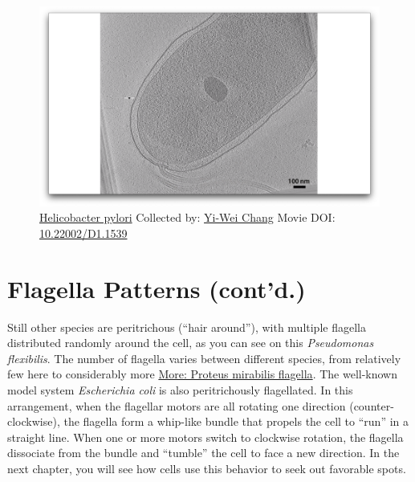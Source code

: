 \documentclass[]{tufte-book}
\begin{document}
\begin{figure}
\includegraphics{movie_stills/6_4a} \caption[\protect\hyperlink{tree}{Helicobacter pylori} Collected by:
\protect\hyperlink{yi-wei_chang}{Yi-Wei Chang} Movie DOI:
\href{https://doi.org/10.22002/D1.1539}{10.22002/D1.1539}]{\protect\hyperlink{tree}{Helicobacter pylori} Collected by:
\protect\hyperlink{yi-wei_chang}{Yi-Wei Chang} Movie DOI:
\href{https://doi.org/10.22002/D1.1539}{10.22002/D1.1539}}\label{fig:6-4a}
\end{figure}

\section{Flagella Patterns (cont'd.)}\label{flagella-patterns-contd.}

Still other species are peritrichous (``hair around''), with multiple
flagella distributed randomly around the cell, as you can see on this
\emph{Pseudomonas flexibilis}. The number of flagella varies between
different species, from relatively few here to considerably more
\protect\hyperlink{Proteus_mirabilis_flagella}{More: Proteus mirabilis
flagella}. The well-known model system \emph{Escherichia coli} is also
peritrichously flagellated. In this arrangement, when the flagellar
motors are all rotating one direction (counter-clockwise), the flagella
form a whip-like bundle that propels the cell to ``run'' in a straight
line. When one or more motors switch to clockwise rotation, the flagella
dissociate from the bundle and ``tumble'' the cell to face a new
direction. In the next chapter, you will see how cells use this behavior
to seek out favorable spots.
\end{document}
